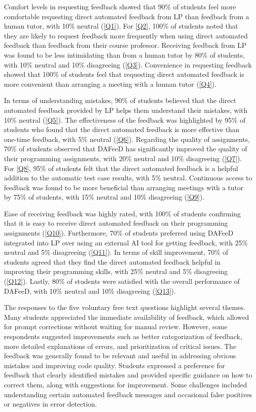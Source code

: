 \documentclass[sigconf,screen,review,anonymous]{acmart}
\begin{document}
Comfort levels in requesting feedback showed that 90\% of students feel more comfortable requesting direct automated feedback from LP than feedback from a human tutor, with 10\% neutral (\ref{Q1}).
For \ref{Q2}, 100\% of students noted that they are likely to request feedback more frequently when using direct automated feedback than feedback from their course professor.
Receiving feedback from LP was found to be less intimidating than from a human tutor by 80\% of students, with 10\% neutral and 10\% disagreeing (\ref{Q3}).
Convenience in requesting feedback showed that 100\% of students feel that requesting direct automated feedback is more convenient than arranging a meeting with a human tutor (\ref{Q4}).


In terms of understanding mistakes, 90\% of students believed that the direct automated feedback provided by LP helps them understand their mistakes, with 10\% neutral (\ref{Q5}).
The effectiveness of the feedback was highlighted by 95\% of students who found that the direct automated feedback is more effective than one-time feedback, with 5\% neutral (\ref{Q6}).
Regarding the quality of assignments, 70\% of students observed that DAFeeD has significantly improved the quality of their programming assignments, with 20\% neutral and 10\% disagreeing (\ref{Q7}).
For \ref{Q8}, 95\% of students felt that the direct automated feedback is a helpful addition to the automatic test case results, with 5\% neutral.
Continuous access to feedback was found to be more beneficial than arranging meetings with a tutor by 75\% of students, with 15\% neutral and 10\% disagreeing (\ref{Q9}).


Ease of receiving feedback was highly rated, with 100\% of students confirming that it is easy to receive direct automated feedback on their programming assignments (\ref{Q10}).
Furthermore, 70\% of students preferred using DAFeeD integrated into LP over using an external AI tool for getting feedback, with 25\% neutral and 5\% disagreeing (\ref{Q11}).
In terms of skill improvement, 70\% of students agreed that they find the direct automated feedback helpful in improving their programming skills, with 25\% neutral and 5\% disagreeing (\ref{Q12}).
Lastly, 80\% of students were satisfied with the overall performance of DAFeeD, with 10\% neutral and 10\% disagreeing (\ref{Q13}).


The responses to the five voluntary free text questions highlight several themes.
Many students appreciated the immediate availability of feedback, which allowed for prompt corrections without waiting for manual review. 
However, some respondents suggested improvements such as better categorization of feedback, more detailed explanations of errors, and prioritization of critical issues. 
The feedback was generally found to be relevant and useful in addressing obvious mistakes and improving code quality. 
Students expressed a preference for feedback that clearly identified mistakes and provided specific guidance on how to correct them, along with suggestions for improvement. 
Some challenges included understanding certain automated feedback messages and occasional false positives or negatives in error detection.
\end{document}
